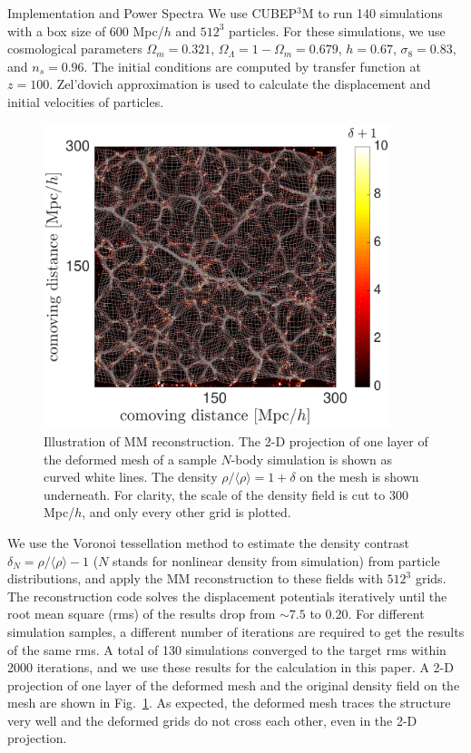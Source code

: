 \begin{section}{Implementation and Power Spectra}
  \label{sec:simulation}
  We use \textsc{CUBEP$^3$M} \cite{bib:Harnois2013} to run
  140 simulations with a box size of 600 Mpc/$h$ and $512^3$ particles.
  For these simulations, we use cosmological
  parameters $\Omega_m=0.321$, $\Omega_{\Lambda}=1-\Omega_m=0.679$,
  $h=0.67$, $\sigma_8=0.83$, and $n_s=0.96$.
  The initial conditions are computed by
  transfer function \cite{bib:Lewis2000}
  at $z=100$.
  Zel'dovich
  approximation is used to calculate the displacement and initial velocities
  of particles.

  \begin{figure}[t!]
    \centering
    \includegraphics[width=0.9\textwidth]{fig1.pdf}
    \caption{ Illustration of MM reconstruction.
      The 2-D projection of one layer of the deformed mesh of a sample
      $N$-body simulation is shown as curved white lines.  The
      density $\rho/\langle\rho\rangle=1+\delta$ on the mesh is shown
      underneath. For clarity, the scale of the density field is cut to 
      300 Mpc/$h$, and only every other grid is plotted.}
    \label{fig:simandrec}
 \end{figure}

 We use the Voronoi tessellation method \cite{bib:Van1994} to estimate the density contrast
 $\delta_N=\rho/\langle\rho\rangle-1$ ($N$ stands for nonlinear density from simulation) from particle distributions, and apply the
 MM reconstruction to these fields with $512^3$ grids.
 The reconstruction code solves the displacement potentials iteratively
 until the root mean square (rms) of the results drop from $\sim 7.5$
 to 0.20. For different simulation samples, a different number of
 iterations are required to get the results of the same rms. A total of
 130 simulations converged to the target rms within 2000 iterations, 
 and we use these results for the calculation in this paper.
 A 2-D projection
 of one layer of the deformed mesh and the original density field on
 the mesh are shown in Fig.~\ref{fig:simandrec}. 
 As expected, the deformed mesh traces the structure very well and
 the deformed grids do not cross each other, even in the 2-D projection.
 

\end{section}
